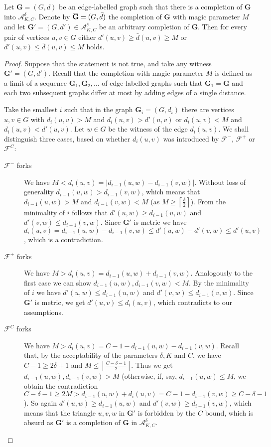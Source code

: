 \documentclass[11pt]{amsart}
\newcommand{\overbar}[1]{\mkern 1.5mu\overline{\mkern-1.5mu#1\mkern-1.5mu}\mkern 1.5mu}
\def\str#1{\mathbf {#1}}
\begin{document}
\begin{lemma}\label{lem:bestcompletion}
Let $\str{G}=(G,d)$ be an edge-labelled graph such that there is a completion of $\str{G}$ into $\mathcal A^\delta_{K,C}$. Denote by $\overbar{\str{G}}=(G,\bar{d})$ the completion of $\str{G}$ with magic parameter $M$  and let $\str{G}'=(G,d')\in\mathcal A^\delta_{K,C}$ be an arbitrary completion of $\str{G}$. Then for every pair of vertices $u,v\in G$ either $d'(u,v) \geq \bar{d}(u,v) \geq M$ or $d'(u,v) \leq \bar{d}(u,v) \leq M$ holds.
\end{lemma}
\begin{proof}
Suppose that the statement is not true, and take any witness $\str{G}'=(G, d')$. Recall that the completion with magic parameter $M$ is defined as a limit of a sequence $\str{G}_1, \str{G}_2, \dots$ of edge-labelled graphs such that $\str{G}_1=\str{G}$ and each two subsequent graphs differ at most by adding edges of a single distance.

Take the smallest $i$ such that in the graph $\str{G}_i = (G,d_i)$ there are vertices $u,v\in G$ with $d_i(u,v) > M$ and $d_i(u,v) > d'(u,v)$ or $d_i(u,v) < M$ and $d_i(u,v) < d'(u,v)$. Let $w\in G$ be the witness of the edge $d_i(u,v)$.
We shall distinguish three cases, based on whether $d_{i}(u,v)$ was introduced by $\mathcal F^-$, $\mathcal F^+$ or $\mathcal F^C$:

\begin{description}
\item[$\mathcal F^-$ forks]
We have $M < d_i(u,v) = |d_{i-1}(u,w)-d_{i-1}(v,w)|$. Without loss of generality $d_{i-1}(u,w) > d_{i-1}(v,w)$, which means that $d_{i-1}(u,w) > M$ and $d_{i-1}(v,w) < M$ (as $M\geq \left\lceil\frac{\delta}{2}\right\rceil$). From the minimality of $i$ follows that $d'(u,w) \geq d_{i-1}(u,w)$ and $d'(v,w)\leq d_{i-1}(v,w)$. Since $\str{G'}$ is metric we have $d_i(u,v) = d_{i-1}(u,\allowbreak w)-d_{i-1}(v,w) \leq d'(u,w)-d'(v,w) \leq d'(u,v)$, which is a contradiction.

\item[$\mathcal F^+$ forks]
We have $M > d_i(u,v) = d_{i-1}(u,w)+d_{i-1}(v,w)$. Analogously to the first case we can show $d_{i-1}(u,w),\allowbreak d_{i-1}(v,\allowbreak w)<M$. By the minimality of $i$ we have $d'(u,w)\leq d_{i-1}(u,w)$ and $d'(v,w)\leq d_{i-1}(v,w)$. Since $\str{G'}$ is metric, we get $d'(u,v)\leq d_i(u,v)$, which contradicts to our assumptions.

\item[$\mathcal F^C$ forks]
We have $M > d_i(u,v) = C-1-d_{i-1}(u,w)-d_{i-1}(v,w)$. Recall that, by the acceptability of the parameters $\delta, K$ and $C$, we have $C-1\geq 2\delta+1$ and $M\leq \left\lfloor \frac{C-\delta-1}{2} \right\rfloor$. Thus we get $d_{i-1}(u,w),d_{i-1}(v,w)>M$ (otherwise, if, say, $d_{i-1}(u,w)\leq M$, we obtain the contradiction $C-\delta-1\geq 2M > d_{i-1}(u,w)+d_i(u,v) = C-1-d_{i-1}(v,w) \geq C-\delta-1$). So again $d'(u,w)\geq d_{i-1}(u,w)$ and $d'(v,w)\geq d_{i-1}(v,w)$, which means that the triangle $u,v,w$ in $\str{G}'$ is forbidden by the $C$ bound, which is absurd as $\str{G}'$ is a completion of $\str{G}$ in $\mathcal A^\delta_{K,C}$.
\end{description}
\end{proof}
\end{document}
